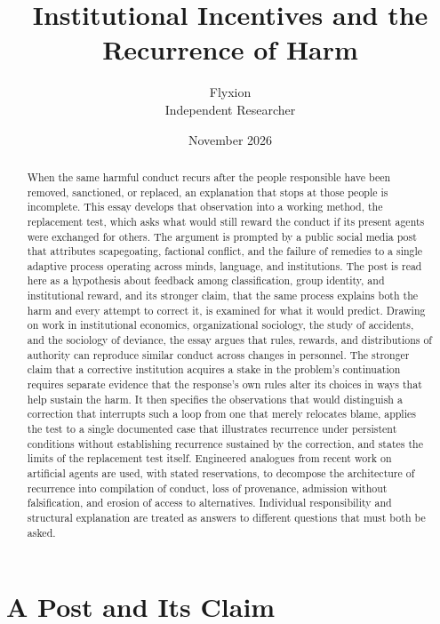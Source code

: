 \documentclass[11pt]{article}
\title{Institutional Incentives and the Recurrence of Harm}
\author{Flyxion\\Independent Researcher}
\date{November 2026}
\theoremstyle{definition}
\begin{document}
\maketitle

\begin{abstract}
\noindent When the same harmful conduct recurs after the people responsible have been removed, sanctioned, or replaced, an explanation that stops at those people is incomplete. This essay develops that observation into a working method, the replacement test, which asks what would still reward the conduct if its present agents were exchanged for others. The argument is prompted by a public social media post that attributes scapegoating, factional conflict, and the failure of remedies to a single adaptive process operating across minds, language, and institutions. The post is read here as a hypothesis about feedback among classification, group identity, and institutional reward, and its stronger claim, that the same process explains both the harm and every attempt to correct it, is examined for what it would predict. Drawing on work in institutional economics, organizational sociology, the study of accidents, and the sociology of deviance, the essay argues that rules, rewards, and distributions of authority can reproduce similar conduct across changes in personnel. The stronger claim that a corrective institution acquires a stake in the problem's continuation requires separate evidence that the response's own rules alter its choices in ways that help sustain the harm. It then specifies the observations that would distinguish a correction that interrupts such a loop from one that merely relocates blame, applies the test to a single documented case that illustrates recurrence under persistent conditions without establishing recurrence sustained by the correction, and states the limits of the replacement test itself. Engineered analogues from recent work on artificial agents are used, with stated reservations, to decompose the architecture of recurrence into compilation of conduct, loss of provenance, admission without falsification, and erosion of access to alternatives. Individual responsibility and structural explanation are treated as answers to different questions that must both be asked.
\end{abstract}

\newpage
\section{A Post and Its Claim}
\end{document}
